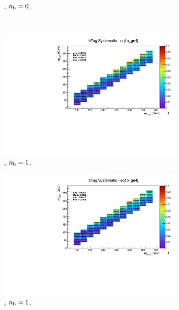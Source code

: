 \begin{figure}[ht!]
\begin{subfigure}[b]{0.32\textwidth}
    \caption{\njhigh, $n_{\text{b}} = 0$.}
  \end{subfigure}\\
  \begin{subfigure}[b]{0.32\textwidth}
    \includegraphics[width=\textwidth, page=12]{Figs/sms/t2degen/v19/systs/T2_4body_bTag_eq1b_ge4j.pdf}
    \caption{\njhigh, $n_{\text{b}} = 1$.}
  \end{subfigure}
  \begin{subfigure}[b]{0.32\textwidth}
    \includegraphics[width=\textwidth, page=8]{Figs/sms/t2degen/v19/systs/T2_4body_bTag_eq1b_ge4j.pdf}
    \caption{\njhigh, $n_{\text{b}} = 1$.}
  \end{subfigure}
  \begin{subfigure}[b]{0.32\textwidth}

\end{subfigure}
\end{figure}
